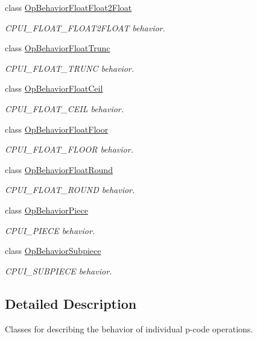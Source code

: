 \begin{DoxyCompactItemize}
class \mbox{\hyperlink{class_op_behavior_float_float2_float}{Op\+Behavior\+Float\+Float2\+Float}}
\begin{DoxyCompactList}\small\item\em C\+P\+U\+I\+\_\+\+F\+L\+O\+A\+T\+\_\+\+F\+L\+O\+A\+T2\+F\+L\+O\+AT behavior. \end{DoxyCompactList}\item 
class \mbox{\hyperlink{class_op_behavior_float_trunc}{Op\+Behavior\+Float\+Trunc}}
\begin{DoxyCompactList}\small\item\em C\+P\+U\+I\+\_\+\+F\+L\+O\+A\+T\+\_\+\+T\+R\+U\+NC behavior. \end{DoxyCompactList}\item 
class \mbox{\hyperlink{class_op_behavior_float_ceil}{Op\+Behavior\+Float\+Ceil}}
\begin{DoxyCompactList}\small\item\em C\+P\+U\+I\+\_\+\+F\+L\+O\+A\+T\+\_\+\+C\+E\+IL behavior. \end{DoxyCompactList}\item 
class \mbox{\hyperlink{class_op_behavior_float_floor}{Op\+Behavior\+Float\+Floor}}
\begin{DoxyCompactList}\small\item\em C\+P\+U\+I\+\_\+\+F\+L\+O\+A\+T\+\_\+\+F\+L\+O\+OR behavior. \end{DoxyCompactList}\item 
class \mbox{\hyperlink{class_op_behavior_float_round}{Op\+Behavior\+Float\+Round}}
\begin{DoxyCompactList}\small\item\em C\+P\+U\+I\+\_\+\+F\+L\+O\+A\+T\+\_\+\+R\+O\+U\+ND behavior. \end{DoxyCompactList}\item 
class \mbox{\hyperlink{class_op_behavior_piece}{Op\+Behavior\+Piece}}
\begin{DoxyCompactList}\small\item\em C\+P\+U\+I\+\_\+\+P\+I\+E\+CE behavior. \end{DoxyCompactList}\item 
class \mbox{\hyperlink{class_op_behavior_subpiece}{Op\+Behavior\+Subpiece}}
\begin{DoxyCompactList}\small\item\em C\+P\+U\+I\+\_\+\+S\+U\+B\+P\+I\+E\+CE behavior. \end{DoxyCompactList}\end{DoxyCompactItemize}


\subsection{Detailed Description}
Classes for describing the behavior of individual p-\/code operations. 

